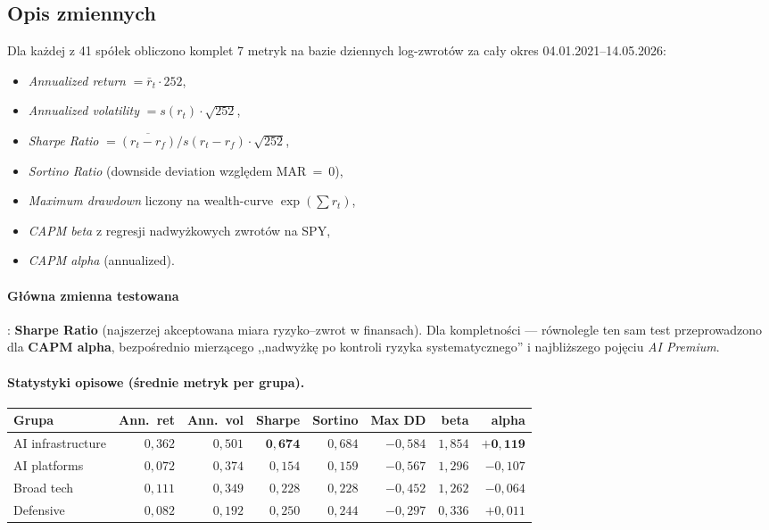 \documentclass[11pt,a4paper]{article}
\begin{document}
\subsection{Opis zmiennych}
Dla każdej z 41 spółek obliczono komplet 7 metryk na bazie dziennych log-zwrotów
za cały okres 04.01.2021--14.05.2026:
\begin{itemize}
  \item \emph{Annualized return} $= \bar r_t \cdot 252$,
  \item \emph{Annualized volatility} $= s(r_t) \cdot \sqrt{252}$,
  \item \emph{Sharpe Ratio} $= \overline{(r_t - r_f)} / s(r_t - r_f) \cdot \sqrt{252}$,
  \item \emph{Sortino Ratio} (downside deviation względem MAR~=~0),
  \item \emph{Maximum drawdown} liczony na wealth-curve $\exp(\sum r_t)$,
  \item \emph{CAPM beta} z regresji nadwyżkowych zwrotów na SPY,
  \item \emph{CAPM alpha} (annualized).
\end{itemize}

\paragraph{Główna zmienna testowana}: \textbf{Sharpe Ratio} (najszerzej akceptowana
miara ryzyko--zwrot w finansach). Dla kompletności --- równolegle ten sam test
przeprowadzono dla \textbf{CAPM alpha}, bezpośrednio mierzącego ,,nadwyżkę po
kontroli ryzyka systematycznego'' i najbliższego pojęciu \emph{AI Premium}.

\paragraph{Statystyki opisowe (średnie metryk per grupa).}
\begin{center}\small
\begin{tabular}{lrrrrrrr}
\toprule
Grupa & Ann.~ret & Ann.~vol & Sharpe & Sortino & Max DD & beta & alpha \\
\midrule
AI infrastructure & $0{,}362$ & $0{,}501$ & $\mathbf{0{,}674}$ & $0{,}684$ & $-0{,}584$ & $1{,}854$ & $\mathbf{+0{,}119}$ \\
AI platforms      & $0{,}072$ & $0{,}374$ & $0{,}154$ & $0{,}159$ & $-0{,}567$ & $1{,}296$ & $-0{,}107$ \\
Broad tech        & $0{,}111$ & $0{,}349$ & $0{,}228$ & $0{,}228$ & $-0{,}452$ & $1{,}262$ & $-0{,}064$ \\
Defensive         & $0{,}082$ & $0{,}192$ & $0{,}250$ & $0{,}244$ & $-0{,}297$ & $0{,}336$ & $+0{,}011$ \\
\bottomrule
\end{tabular}
\end{center}
\end{document}
